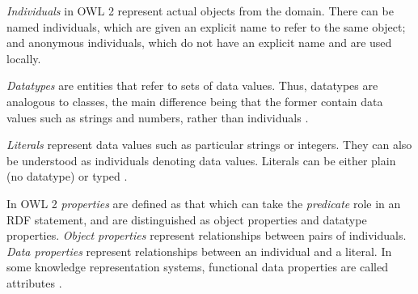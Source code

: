 	\textit{Individuals} in OWL 2 represent actual objects from the domain. There can be named individuals, which are given an explicit name to refer to the same object; and anonymous individuals, which do not have an explicit name and are used locally.
	
	\textit{Datatypes} are entities that refer to sets of data values. Thus, datatypes are analogous to classes, the main difference being that the former contain data values such as strings and numbers, rather than individuals \cite{owl2}.

	\textit{Literals} represent data values such as particular strings or integers. They can also be understood as individuals denoting data values. Literals can be either plain (no datatype) or typed \cite{owl2}.
	
	In OWL 2 \textit{properties} are defined as that which can take the \textit{predicate} role in an RDF statement, and are distinguished as object properties and datatype properties. \textit{Object properties} represent relationships between pairs of individuals. \textit{Data properties} represent relationships between an individual and a literal. In some knowledge representation systems, functional data properties are called attributes \cite{owl2}. 
	